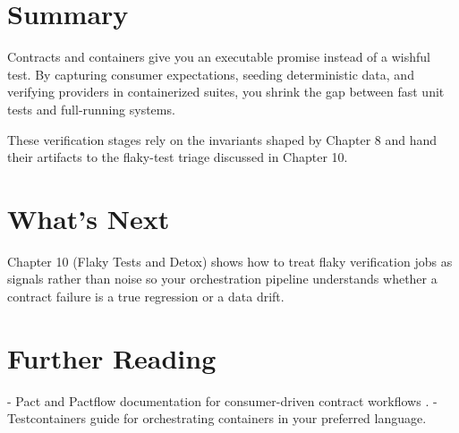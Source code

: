 \section{Summary}
Contracts and containers give you an executable promise instead of a wishful test. By capturing consumer expectations, seeding deterministic data, and verifying providers in containerized suites, you shrink the gap between fast unit tests and full-running systems.

These verification stages rely on the invariants shaped by Chapter 8 and hand their artifacts to the flaky-test triage discussed in Chapter 10.

\section{What's Next}
Chapter 10 (Flaky Tests and Detox) shows how to treat flaky verification jobs as signals rather than noise so your orchestration pipeline understands whether a contract failure is a true regression or a data drift.

\section{Further Reading}
- Pact and Pactflow documentation for consumer-driven contract workflows \citep{pactflow2023}.  
- Testcontainers guide for orchestrating containers in your preferred language.
